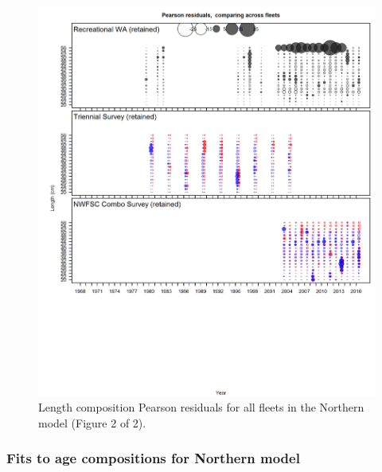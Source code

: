 \documentclass[12pt,]{article}
\begin{document}
\begin{figure}[htbp]
\centering
\includegraphics{r4ss/plots_mod1/comp_lenfit__page2_multi-fleet_comparison.png}
\caption{Length composition Pearson residuals for all fleets in the
Northern model (Figure 2 of
2).\label{fig:comp_Pearson_length_mod1_page2}}
\end{figure}

\subsubsection{Fits to age compositions for Northern
model}\label{fits-to-age-compositions-for-northern-model}
\end{document}
